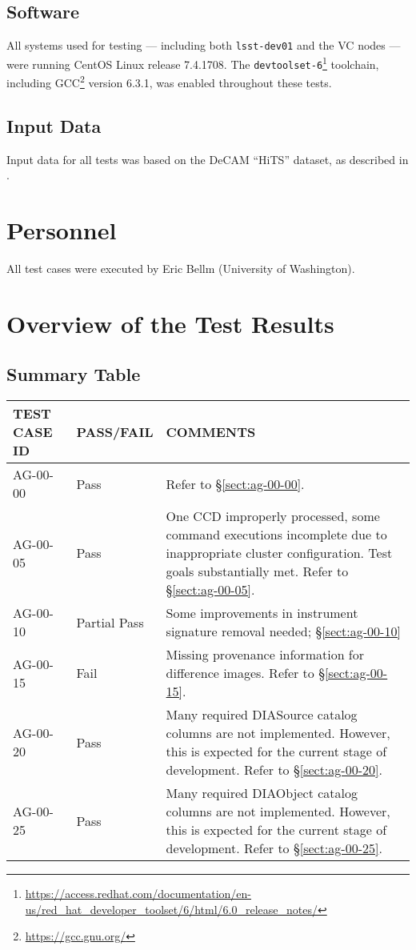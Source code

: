 \documentclass[DM,lsstdraft,STR,toc]{lsstdoc}
\begin{document}
\subsection{Software}
\label{sect:swconf}

All systems used for testing --- including both \texttt{lsst-dev01} and the VC nodes --- were running CentOS Linux release 7.4.1708.
The \texttt{devtoolset-6}\footnote{\url{https://access.redhat.com/documentation/en-us/red_hat_developer_toolset/6/html/6.0_release_notes/}} toolchain, including GCC\footnote{\url{https://gcc.gnu.org/}} version 6.3.1, was enabled throughout these tests.

\subsection{Input Data}
\label{sect:inputdata}

Input data for all tests was based on the DeCAM “HiTS” dataset, as described in .

\section{Personnel}
\label{sect:personnel}

All test cases were executed by Eric Bellm (University of Washington).

\newpage

\section{Overview of the Test Results}
\label{sect:overview}

\subsection{Summary Table}
\label{sect:summarytable}

\begin{longtable} {|p{}|p{}|p{}|}\hline
{\bf TEST CASE ID} & {\bf PASS/FAIL} & {\bf COMMENTS} \\\hline
AG-00-00 & Pass & Refer to \S\ref{sect:ag-00-00}. \\\hline
AG-00-05 & Pass & One CCD improperly processed, some command executions incomplete due to inappropriate cluster configuration. Test goals substantially met. Refer to \S\ref{sect:ag-00-05}. \\\hline
AG-00-10 & Partial Pass & Some improvements in instrument signature removal needed; \S\ref{sect:ag-00-10} \\\hline
AG-00-15 & Fail & Missing provenance information for difference images. Refer to \S\ref{sect:ag-00-15}. \\\hline
AG-00-20 & Pass & Many required DIASource catalog columns are not implemented. However, this is expected for the current stage of development. Refer to \S\ref{sect:ag-00-20}. \\\hline
AG-00-25 & Pass & Many required DIAObject catalog columns are not implemented. However, this is expected for the current stage of development. Refer to \S\ref{sect:ag-00-25}. \\\hline
\end{longtable}
\end{document}
